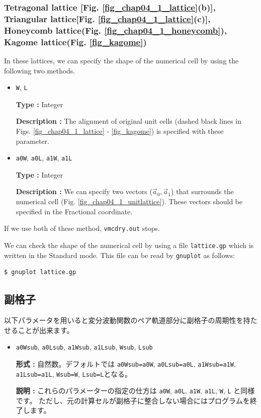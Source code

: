 \subsubsection{Tetragonal lattice [Fig. \ref{fig_chap04_1_lattice}(b)], 
Triangular lattice[Fig. \ref{fig_chap04_1_lattice}(c)],
Honeycomb lattice(Fig. \ref{fig_chap04_1_honeycomb}),
Kagome lattice(Fig. \ref{fig_kagome})}

In these lattices,
we can specify the shape of the numerical cell by using the following two methods.

\begin{itemize}

\item \verb|W|, \verb|L|

{\bf Type :} Integer

{\bf Description :} The alignment of original unit cells 
(dashed black lines in Figs. \ref{fig_chap04_1_lattice} - \ref{fig_kagome})
is specified with these parameter.

\item \verb|a0W|, \verb|a0L|, \verb|a1W|, \verb|a1L|

{\bf Type :} Integer

{\bf Description :} 
We can specify two vectors (${\vec a}_0, {\vec a}_1$)
that surrounds the numerical cell (Fig. \ref{fig_chap04_1_unitlattice}).
These vectors should be specified in the Fractional coordinate.

\end{itemize}

If we use both of these method, \verb|vmcdry.out| stops.

We can check the shape of the numerical cell
by using a file \verb|lattice.gp|
which is written in the Standard mode.
This file can be read by \verb|gnuplot| as follows:
\begin{verbatim}
$ gnuplot lattice.gp
\end{verbatim}

\subsection{副格子}

以下パラメータを用いると変分波動関数のペア軌道部分に副格子の周期性を持たせることが出来ます。

\begin{itemize}

\item \verb|a0Wsub|, \verb|a0Lsub|, \verb|a1Wsub|, \verb|a1Lsub|, \verb|Wsub|, \verb|Lsub|

{\bf 形式 :} 自然数。デフォルトでは
\verb|a0Wsub=a0W|, \verb|a0Lsub=a0L|, \verb|a1Wsub=a1W|, \verb|a1Lsub=a1L|, 
\verb|Wsub=W|, \verb|Lsub=L|となる。

{\bf 説明 :} これらのパラメーターの指定の仕方は
\verb|a0W|, \verb|a0L|, \verb|a1W|, \verb|a1L|, \verb|W|, \verb|L|
と同様です。
ただし、元の計算セルが副格子に整合しない場合にはプログラムを終了します。

\end{itemize}


